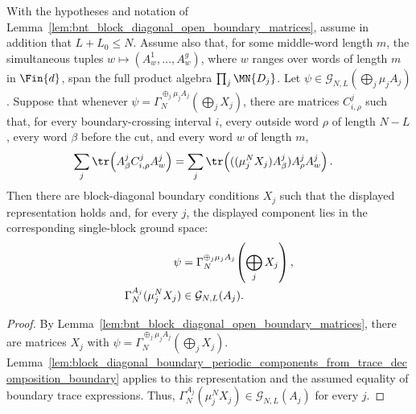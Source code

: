 \begin{lemma}
    \label{lem:block_diagonal_boundary_periodic_components_from_trace_decomposition}
    \leanok
    With the hypotheses and notation of
    Lemma~\ref{lem:bnt_block_diagonal_open_boundary_matrices}, assume in
    addition that $L+L_0\le N$. Assume also that, for some middle-word length
    $m$, the simultaneous tuples $w\mapsto(A^1_w,\ldots,A^g_w)$, where $w$
    ranges over words of length $m$ in $\Fin{d}$, span the full product
    algebra $\prod_j\MN{D_j}$. Let
    $\psi\in\mathcal G_{N,L}(\bigoplus_j\mu_jA_j)$. Suppose that whenever
    $\psi=\Gamma_N^{\oplus_j\mu_jA_j}(\bigoplus_jX_j)$, there are matrices
    $C^j_{i,\rho}$ such that, for every boundary-crossing interval $i$, every
    outside word $\rho$ of length $N-L$, every word $\beta$ before the cut,
    and every word $w$ of length $m$,
    \begin{align}
        \sum_j\tr\!\left(A^j_\beta C^j_{i,\rho}A^j_w\right)
         & =
        \sum_j\tr\!\left(((\mu_j^NX_j)A^j_\beta)A^j_\rho A^j_w\right).
        \notag
    \end{align}
    Then there are block-diagonal boundary conditions $X_j$ such that the displayed
    representation holds and, for every $j$, the displayed component lies in
    the corresponding single-block ground space:
    \begin{align}
        \psi
         & =
        \Gamma_N^{\oplus_j\mu_jA_j}\!\left(\bigoplus_jX_j\right),
        \notag                       \\
        \Gamma_N^{A_j}(\mu_j^NX_j)
         & \in\mathcal G_{N,L}(A_j).
        \notag
    \end{align}
\end{lemma}

\begin{proof}
    \leanok
    By Lemma~\ref{lem:bnt_block_diagonal_open_boundary_matrices}, there are
    matrices $X_j$ with
    $\psi=\Gamma_N^{\oplus_j\mu_jA_j}(\bigoplus_jX_j)$.
    Lemma~\ref{lem:block_diagonal_boundary_periodic_components_from_trace_decomposition_boundary}
    applies to this representation and the assumed equality of boundary trace
    expressions. Thus,
    $\Gamma_N^{A_j}(\mu_j^NX_j)\in\mathcal G_{N,L}(A_j)$ for every $j$.
\end{proof}

